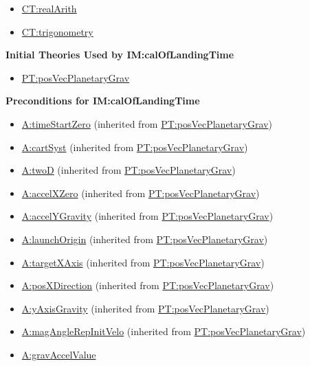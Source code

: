 \documentclass[12pt]{article}
\begin{document}
\begin{itemize}
\item \hyperref[CT:realArith]{CT:realArith}
\item \hyperref[CT:trigonometry]{CT:trigonometry}
\end{itemize}

\noindent \textbf{Initial Theories Used by IM:calOfLandingTime}

\begin{itemize}
\item \hyperref[PT:posVecPlanetaryGrav]{PT:posVecPlanetaryGrav}
\end{itemize}

\noindent \textbf{Preconditions for IM:calOfLandingTime}
\begin{itemize}
\item \hyperref[timeStartZero]{A:timeStartZero} (inherited from \hyperref[PT:posVecPlanetaryGrav]{PT:posVecPlanetaryGrav})
\item \hyperref[cartSyst]{A:cartSyst} (inherited from \hyperref[PT:posVecPlanetaryGrav]{PT:posVecPlanetaryGrav})
\item \hyperref[twoD]{A:twoD} (inherited from \hyperref[PT:posVecPlanetaryGrav]{PT:posVecPlanetaryGrav})
\item \hyperref[accelXZero]{A:accelXZero} (inherited from \hyperref[PT:posVecPlanetaryGrav]{PT:posVecPlanetaryGrav})
\item \hyperref[accelYGravity]{A:accelYGravity} (inherited from \hyperref[PT:posVecPlanetaryGrav]{PT:posVecPlanetaryGrav})
\item \hyperref[launchOrigin]{A:launchOrigin} (inherited from \hyperref[PT:posVecPlanetaryGrav]{PT:posVecPlanetaryGrav})
\item \hyperref[targetXAxis]{A:targetXAxis} (inherited from \hyperref[PT:posVecPlanetaryGrav]{PT:posVecPlanetaryGrav})
\item \hyperref[posXDirection]{A:posXDirection} (inherited from \hyperref[PT:posVecPlanetaryGrav]{PT:posVecPlanetaryGrav})
\item \hyperref[yAxisGravity]{A:yAxisGravity} (inherited from \hyperref[PT:posVecPlanetaryGrav]{PT:posVecPlanetaryGrav})
\item \hyperref[magAngleRepInitVelo]{A:magAngleRepInitVelo} (inherited from \hyperref[PT:posVecPlanetaryGrav]{PT:posVecPlanetaryGrav})
\item \hyperref[gravAccelValue]{A:gravAccelValue}

\end{itemize}
\end{document}
